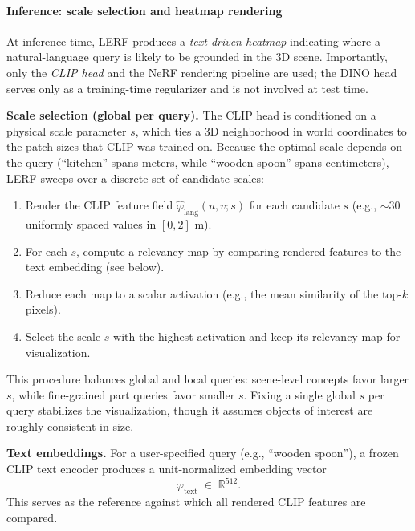\begin{enrichment}
\begin{enrichment}
        \paragraph{Inference: scale selection and heatmap rendering}
        At inference time, LERF produces a \emph{text-driven heatmap} indicating where a natural-language query is likely to be grounded in the 3D scene. Importantly, only the \emph{CLIP head} and the NeRF rendering pipeline are used; the DINO head serves only as a training-time regularizer and is not involved at test time.
        
        \medskip
        \noindent
        \textbf{Scale selection (global per query).}
        The CLIP head is conditioned on a physical scale parameter \(s\), which ties a 3D neighborhood in world coordinates to the patch sizes that CLIP was trained on. Because the optimal scale depends on the query (``kitchen'' spans meters, while ``wooden spoon'' spans centimeters), LERF sweeps over a discrete set of candidate scales:
        \begin{enumerate}
            \item Render the CLIP feature field \(\hat{\varphi}_{\text{lang}}(u,v;s)\) for each candidate \(s\) (e.g., \(\sim30\) uniformly spaced values in \([0,2]\) m).
            \item For each \(s\), compute a relevancy map by comparing rendered features to the text embedding (see below).
            \item Reduce each map to a scalar activation (e.g., the mean similarity of the top-\(k\) pixels).
            \item Select the scale \(s\) with the highest activation and keep its relevancy map for visualization.
        \end{enumerate}
        This procedure balances global and local queries: scene-level concepts favor larger \(s\), while fine-grained part queries favor smaller \(s\). Fixing a single global \(s\) per query stabilizes the visualization, though it assumes objects of interest are roughly consistent in size.
        
        \medskip
        \noindent
        \textbf{Text embeddings.}
        For a user-specified query (e.g., ``wooden spoon''), a frozen CLIP text encoder produces a unit-normalized embedding vector
        \[
        \varphi_{\text{text}} \;\in\; \mathbb{R}^{512}.
        \]
        This serves as the reference against which all rendered CLIP features are compared.
        

\end{enrichment}
\end{enrichment}
